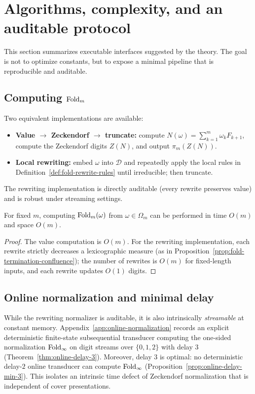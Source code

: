 \section{Algorithms, complexity, and an auditable protocol}\label{sec:algorithms}

This section summarizes executable interfaces suggested by the theory.
The goal is not to optimize constants, but to expose a minimal pipeline that is reproducible and auditable.

\subsection{Computing $\mathrm{Fold}_m$}\label{subsec:algo-fold}
Two equivalent implementations are available:
\begin{itemize}
  \item \textbf{Value $\to$ Zeckendorf $\to$ truncate:} compute $N(\omega)=\sum_{k=1}^m \omega_k F_{k+1}$, compute the Zeckendorf digits $Z(N)$, and output $\pi_m(Z(N))$.
  \item \textbf{Local rewriting:} embed $\omega$ into $\mathcal{D}$ and repeatedly apply the local rules in Definition~\ref{def:fold-rewrite-rules} until irreducible; then truncate.
\end{itemize}
The rewriting implementation is directly auditable (every rewrite preserves value) and is robust under streaming settings.

\begin{proposition}\label{prop:fold-complexity}
For fixed $m$, computing $\mathrm{Fold}_m(\omega)$ from $\omega\in\Omega_m$ can be performed in time $O(m)$ and space $O(m)$.
\end{proposition}

\begin{proof}
The value computation is $O(m)$.
For the rewriting implementation, each rewrite strictly decreases a lexicographic measure (as in Proposition~\ref{prop:fold-termination-confluence}); the number of rewrites is $O(m)$ for fixed-length inputs, and each rewrite updates $O(1)$ digits.
\end{proof}

\subsection{Online normalization and minimal delay}\label{subsec:algo-online}
While the rewriting normalizer is auditable, it is also intrinsically \emph{streamable} at constant memory.
Appendix~\ref{app:online-normalization} records an explicit deterministic finite-state subsequential transducer computing the one-sided normalization $\mathrm{Fold}_\infty$ on digit streams over $\{0,1,2\}$ with delay $3$ (Theorem~\ref{thm:online-delay-3}).
Moreover, delay $3$ is optimal: no deterministic delay-$2$ online transducer can compute $\mathrm{Fold}_\infty$ (Proposition~\ref{prop:online-delay-min-3}).
This isolates an intrinsic time defect of Zeckendorf normalization that is independent of cover presentations.

